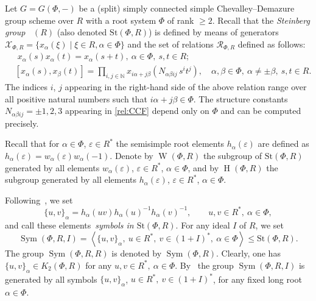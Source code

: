 \documentclass[oneside,12pt]{amsart}
\numberwithin{equation}{section}
\numberwithin{lem}{section}
\theoremstyle{definition}
\theoremstyle{remark}
\DeclareMathOperator{\St}{St^G}
\DeclareMathOperator{\WW}{W}
\DeclareMathOperator{\HH}{H}
\newcommand{\Stb}{\mathrm{St}}
\DeclareMathOperator{\Stsym}{Sym}
\begin{document}
Let $G=G(\Phi,-)$ be a (split) simply connected simple Chevalley--Demazure group scheme
over $R$ with a root system $\Phi$ of rank $\geq 2$.
Recall that the \emph{Steinberg group} $\St(R)$ (also denoted $\Stb(\Phi, R)$) is defined by means of generators
$\mathcal{X}_{\Phi, R} = \{x_{\alpha}(\xi) \mid \xi\in R, \alpha\in\Phi\}$ and the set of relations $\mathcal{R}_{\Phi, R}$ defined as follows:
\begin{align}
& \phantom{[}
x_\alpha(s) x_\alpha(t) = x_\alpha(s+t),\ \alpha\in\Phi,\ s,t\in R; \label{rel:add}\\
& [x_\alpha(s), x_\beta(t)] = \prod\limits_{i,j\in\mathbb{N}}
 x_{i\alpha + j\beta}\left(N_{\alpha\beta ij}\, s^i t^j\right),\quad \alpha,\beta\in\Phi,\ \alpha\neq\pm\beta,\ s,t\in R. \label{rel:CCF}
\end{align}
The indices $i$, $j$ appearing in the right-hand side of the above relation range over
all positive natural numbers such that $i\alpha + j\beta\in\Phi$.
The structure constants $N_{\alpha \beta i j}=\pm 1,2,3$ appearing in \eqref{rel:CCF} depend only on $\Phi$ and can be computed precisely.

Recall that for $\alpha\in\Phi$, $\varepsilon\in R^*$ the semisimple root elements $h_\alpha(\varepsilon)$ are defined as $h_\alpha(\varepsilon)=w_\alpha(\varepsilon)w_\alpha(-1)$.
Denote by $\WW(\Phi, R)$ the subgroup of $\Stb(\Phi, R)$ generated by all elements
$w_\alpha(\varepsilon)$, $\varepsilon\in R^*$, $\alpha\in\Phi$, and by $\HH(\Phi,R)$
 the subgroup generated by all elements
$h_\alpha(\varepsilon)$, $\varepsilon\in R^*$, $\alpha\in\Phi$.

Following~\cite{Ste73}, we set
$$
\{u,v\}_\alpha=h_\alpha(uv)h_\alpha(u)^{-1}h_\alpha(v)^{-1},\qquad u,v\in R^*,\ \alpha\in\Phi,
$$
and call these elements~\emph{symbols in $\Stb(\Phi,R)$}.
For any ideal $I$ of $R$, we set
$$
\Stsym(\Phi,R,I)=\left<\{u,v\}_\alpha,\ u\in R^*,\ v\in (1+I)^*,\ \alpha\in\Phi\right>\le\Stb(\Phi,R).
$$
The group $\Stsym(\Phi,R,R)$ is denoted by $\Stsym(\Phi,R)$.
Clearly, one has $\{u,v\}_\alpha\in K_2(\Phi,R)$ for any $u,v\in R^*,\ \alpha\in\Phi$. By~\cite[Prop. 1.3 (c)]{Ste73}
the group $\Stsym(\Phi,R,I)$ is  generated by all symbols $\{u,v\}_\alpha$,
$u\in R^*,\ v\in (1+I)^*$, for any fixed long root $\alpha\in\Phi$.



\end{document}
